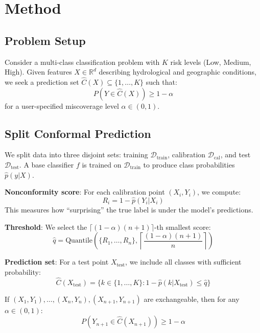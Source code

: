 \documentclass{article}
\newcommand{\R}{\mathbb{R}}
\begin{document}
\section{Method}

\subsection{Problem Setup}

Consider a multi-class classification problem with $K$ risk levels (Low, Medium, High). Given features $X \in \R^d$ describing hydrological and geographic conditions, we seek a prediction set $\hat{C}(X) \subseteq \{1, \ldots, K\}$ such that:
\begin{equation}
    P(Y \in \hat{C}(X)) \geq 1 - \alpha
    \label{eq:coverage}
\end{equation}
for a user-specified miscoverage level $\alpha \in (0, 1)$.

\subsection{Split Conformal Prediction}

We split data into three disjoint sets: training $\mathcal{D}_{\text{train}}$, calibration $\mathcal{D}_{\text{cal}}$, and test $\mathcal{D}_{\text{test}}$. A base classifier $f$ is trained on $\mathcal{D}_{\text{train}}$ to produce class probabilities $\hat{p}(y|X)$.

\textbf{Nonconformity score}: For each calibration point $(X_i, Y_i)$, we compute:
\begin{equation}
    R_i = 1 - \hat{p}(Y_i | X_i)
\end{equation}
This measures how ``surprising'' the true label is under the model's predictions.

\textbf{Threshold}: We select the $\lceil (1-\alpha)(n+1) \rceil$-th smallest score:
\begin{equation}
    \hat{q} = \text{Quantile}\left(\{R_1, \ldots, R_n\}, \left\lceil \frac{(1-\alpha)(n+1)}{n} \right\rceil\right)
\end{equation}

\textbf{Prediction set}: For a test point $X_{\text{test}}$, we include all classes with sufficient probability:
\begin{equation}
    \hat{C}(X_{\text{test}}) = \{k \in \{1, \ldots, K\} : 1 - \hat{p}(k | X_{\text{test}}) \leq \hat{q}\}
\end{equation}

\begin{theorem}
If $(X_1, Y_1), \ldots, (X_n, Y_n), (X_{n+1}, Y_{n+1})$ are exchangeable, then for any $\alpha \in (0,1)$:
\[
    P(Y_{n+1} \in \hat{C}(X_{n+1})) \geq 1 - \alpha
\]
\end{theorem}
\end{document}
